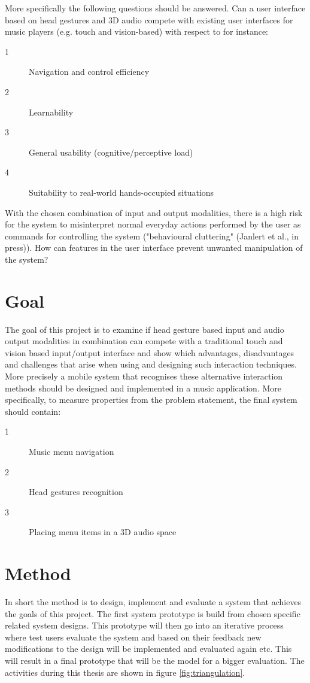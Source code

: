 More specifically the following questions should be answered. Can a user interface based on head gestures and 3D audio compete with existing user interfaces for music players (e.g. touch and vision-based) with respect to for instance:
\begin{description}
\item[1] Navigation and control efficiency
\item[2] Learnability
\item[3] General usability (cognitive/perceptive load)
\item[4] Suitability to real-world hands-occupied situations
\end{description}
With the chosen combination of input and output modalities, there is a high risk for the system to misinterpret normal everyday actions performed by the user as commands for controlling the system ("behavioural cluttering" (Janlert et al., in press)). How can features in the user interface prevent unwanted manipulation of the system?

\section{Goal}
The goal of this project is to examine if head gesture based input and audio output modalities in combination can compete with a traditional touch and vision based input/output interface and show which advantages, disadvantages and challenges that arise when using and designing such interaction techniques. More precisely a mobile system that recognises these alternative interaction methods should be designed and implemented in a music application. More specifically, to measure properties from the problem statement, the final system should contain:
\begin{description}
\item[1] Music menu navigation
\item[2] Head gestures recognition
\item[3] Placing menu items in a 3D audio space
\end{description}


\section{Method}
In short the method is to design, implement and evaluate a system that achieves the goals of this project. The first system prototype is build from chosen specific related system designs. This prototype will then go into an iterative process where test users evaluate the system and based on their feedback new modifications to the design will be implemented and evaluated again etc. This will result in a final prototype that will be the model for a bigger evaluation. The activities during this thesis are shown in figure \ref{fig:triangulation}.

